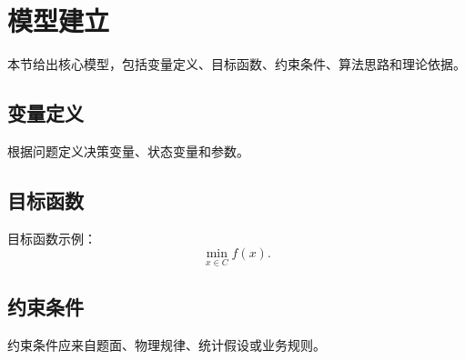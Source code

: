 \section{模型建立}

本节给出核心模型，包括变量定义、目标函数、约束条件、算法思路和理论依据。

\subsection{变量定义}

根据问题定义决策变量、状态变量和参数。

\subsection{目标函数}

目标函数示例：
\begin{equation}
  \min_{x \in C} f(x).
\end{equation}

\subsection{约束条件}

约束条件应来自题面、物理规律、统计假设或业务规则。

